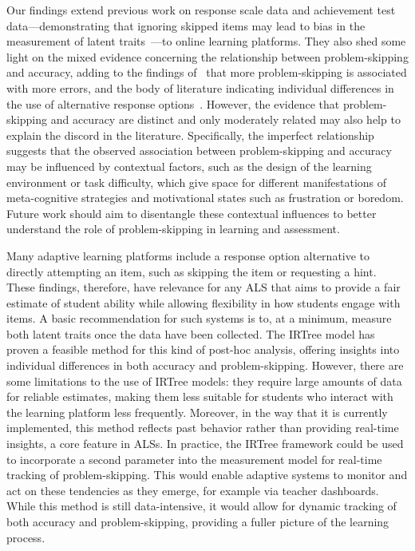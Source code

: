 \documentclass[11pt]{article}
\begin{document}
Our findings extend previous work on response scale data and achievement test data---demonstrating that ignoring skipped items may lead to bias in the measurement of latent traits~\parencite{holman2005modelling, pohl2014dealing, huang2020mixture, okumura2014empirical, debeer2017modeling}---to online learning platforms. They also shed some light on the mixed evidence concerning the relationship between problem-skipping and accuracy, adding to the findings of~\textcite{norum2024student} that more problem-skipping is associated with more errors, and the body of literature indicating individual differences in the use of alternative response options~\parencite{norum2024student, goldin2012learner, goldin2013hints}. However, the evidence that problem-skipping and accuracy are distinct and only moderately related may also help to explain the discord in the literature. Specifically, the imperfect relationship suggests that the observed association between problem-skipping and accuracy may be influenced by contextual factors, such as the design of the learning environment or task difficulty, which give space for different manifestations of meta-cognitive strategies and motivational states such as frustration or boredom. Future work should aim to disentangle these contextual influences to better understand the role of problem-skipping in learning and assessment. 

Many adaptive learning platforms include a response option alternative to directly attempting an item, such as skipping the item or requesting a hint. These findings, therefore, have relevance for any ALS that aims to provide a fair estimate of student ability while allowing flexibility in how students engage with items. A basic recommendation for such systems is to, at a minimum, measure both latent traits once the data have been collected. The IRTree model has proven a feasible method for this kind of post-hoc analysis, offering insights into individual differences in both accuracy and problem-skipping. However, there are some limitations to the use of IRTree models: they require large amounts of data for reliable estimates, making them less suitable for students who interact with the learning platform less frequently. Moreover, in the way that it is currently implemented, this method reflects past behavior rather than providing real-time insights, a core feature in ALSs. In practice, the IRTree framework could be used to incorporate a second parameter into the measurement model for real-time tracking of problem-skipping. This would enable adaptive systems to monitor and act on these tendencies as they emerge, for example via teacher dashboards. While this method is still data-intensive, it would allow for dynamic tracking of both accuracy and problem-skipping, providing a fuller picture of the learning process. 
\end{document}
